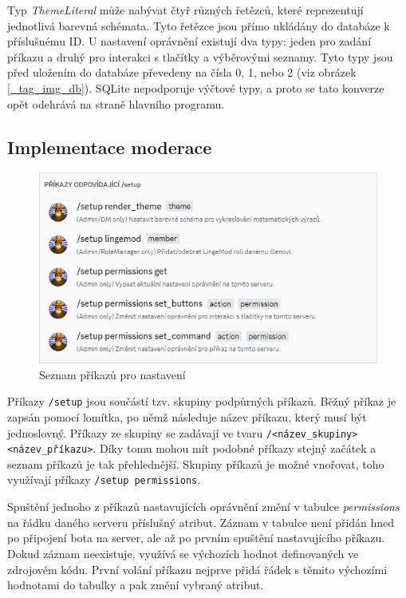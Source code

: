 \documentclass[FM]{tulthesis}
\begin{document}
	Typ \textit{ThemeLiteral} může nabývat čtyř různých řetězců, které reprezentují jednotlivá barevná schémata. Tyto řetězce jsou přímo ukládány do databáze k příslušnému ID. U nastavení oprávnění existují dva typy: jeden pro zadání příkazu a druhý pro interakci s tlačítky a výběrovými seznamy. Tyto typy jsou před uložením do databáze převedeny na čísla 0, 1, nebo 2 (viz obrázek \ref{_tag_img_db}). SQLite nepodporuje výčtové typy, a proto se tato konverze opět odehrává na straně hlavního programu.
	
	\subsection{Implementace moderace}
	
	\begin{figure}[ht]
		\centering
		\includegraphics[width=\textwidth]{img/SetupCommands}
		\caption{Seznam příkazů pro nastavení}
	\end{figure}
	
	Příkazy \verb|/setup| jsou součástí tzv. skupiny podpůrných příkazů. Běžný příkaz je zapsán pomocí lomítka, po němž následuje název příkazu, který musí být jednoslovný. Příkazy ze skupiny se zadávají ve tvaru \verb|/<název_skupiny> <název_příkazu>|. Díky tomu mohou mít podobné příkazy stejný začátek a seznam příkazů je tak přehlednější. Skupiny příkazů je možné vnořovat, toho využívají příkazy \verb|/setup permissions|.
	
	Spuštění jednoho z příkazů nastavujících oprávnění změní v tabulce \textit{permissions} na řádku daného serveru příslušný atribut. Záznam v tabulce není přidán hned po připojení bota na server, ale až po prvním spuštění nastavujícího příkazu. Dokud záznam neexistuje, využívá se výchozích hodnot definovaných ve zdrojovém kódu. První volání příkazu nejprve přidá řádek s těmito výchozími hodnotami do tabulky a pak změní vybraný atribut.
	
\end{document}
